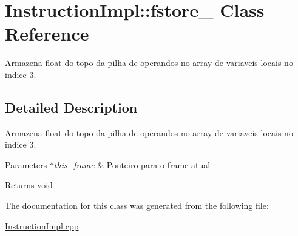 \hypertarget{class_instruction_impl_1_1fstore__3}{}\section{Instruction\+Impl\+:\+:fstore\+\_ Class Reference}
\label{class_instruction_impl_1_1fstore__3}


Armazena float do topo da pilha de operandos no array de variaveis locais no indice 3.  




\subsection{Detailed Description}
Armazena float do topo da pilha de operandos no array de variaveis locais no indice 3. 


\begin{DoxyParams}{Parameters}
{\em $\ast$this\+\_\+frame} & Ponteiro para o frame atual \\
\hline
\end{DoxyParams}
\begin{DoxyReturn}{Returns}
void 
\end{DoxyReturn}


The documentation for this class was generated from the following file\+:\begin{DoxyCompactItemize}
\item 
\hyperlink{_instruction_impl_8cpp}{Instruction\+Impl.\+cpp}\end{DoxyCompactItemize}
